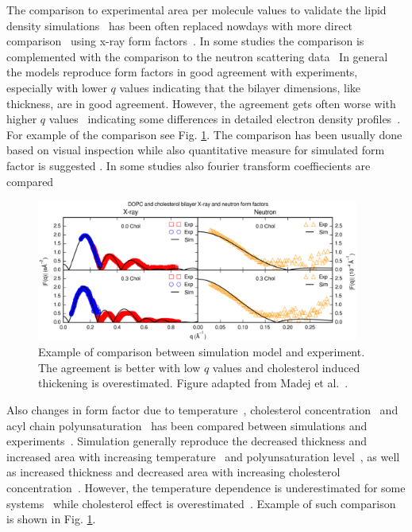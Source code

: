 \documentclass[aps,prl,superscriptaddress,twocolumn]{revtex4}
\begin{document}
The comparison to experimental area per molecule values to validate the lipid density simulations~\cite{tieleman97} has
been often replaced nowdays with more direct comparison~\cite{nagle00} using x-ray form 
factors~\cite{hogberg08,chiu09,klauda10,dickson12,jambeck12,lim12,klauda12,jambeck13,chowdhary13,lee14,maciejewski14,dickson14,tjornhammar14,madej15,kulig15b}.
In some studies the comparison is complemented with the comparison to the neutron scattering 
data~\cite{dickson12,jambeck12,lee14,dickson14,tjornhammar14,madej15}
In general the models reproduce form factors in good agreement with experiments, especially with lower $q$ values
indicating that the bilayer dimensions, like thickness, are in good agreement. However, the agreement gets often worse
with higher $q$ 
values~\cite{chiu09,klauda10,klauda12,dickson12,lim12,jambeck12,chowdhary13,jambeck13,lee14,maciejewski14,dickson14,kulig15b,madej15}
indicating some differences in detailed electron density profiles~\cite{??}.
For example of the comparison see Fig. \ref{FFcomp}.
The comparison has been usually done based on visual inspection while also quantitative measure
for simulated form factor is suggested \cite{kucerka10}.
In some studies also fourier transform coeffiecients are compared \cite{benz05,??}
\begin{figure}[]
  \includegraphics[width=10.6cm]{../Fig/FFcompMADEJ.eps}
\newline
  \caption{\label{FFcomp}
    Example of comparison between simulation model and experiment.
    The agreement is better with low $q$ values and cholesterol induced thickening is overestimated.
    Figure adapted from Madej et al.~\cite{madej15}.
  } 
\end{figure}


Also changes in form factor due to temperature~\cite{jambeck12,zhuang14}, cholesterol concentration~\cite{jambeck13,madej15} 
and acyl chain polyunsaturation~\cite{eldho03,klauda12} 
has been compared between simulations and experiments~\cite{eldho03,kucerka05,pan08,hodzic08,kucerka08,pan09,khelasvili10,kucerka11}.
Simulation generally reproduce the decreased thickness and increased area with increasing temperature~\cite{jambeck12,zhuang14} and 
polyunsaturation level~\cite{eldho03,klauda12}, 
as well as increased thickness and decreased area with increasing cholesterol concentration~\cite{jambeck13,madej15}.
However, the temperature dependence is underestimated for some systems~\cite{jambeck12,zhuang14} while cholesterol
effect is overestimated~\cite{jambeck13,madej15}. Example of such comparison is shown in Fig. \ref{FFcomp}.
\end{document}
